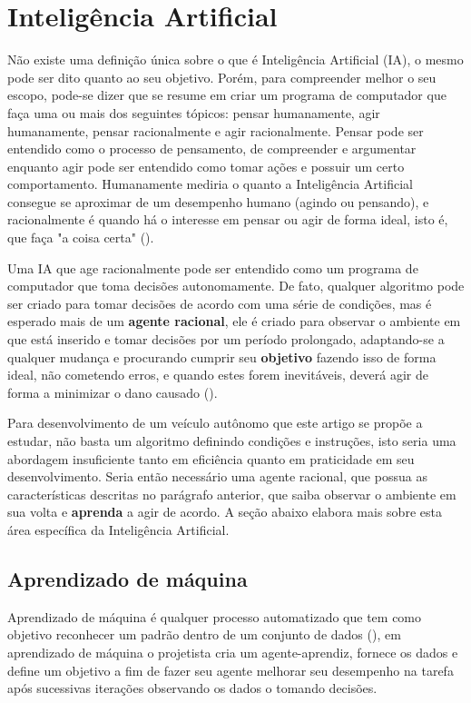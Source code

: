 \section{Inteligência Artificial}
Não existe uma definição única sobre o que é Inteligência Artificial (IA), o mesmo pode ser dito quanto ao seu objetivo. Porém, para compreender melhor o seu escopo, pode-se dizer que se resume em criar um programa de computador que faça uma ou mais dos seguintes tópicos: pensar humanamente, agir humanamente, pensar racionalmente e agir racionalmente. Pensar pode ser entendido como o processo de pensamento, de compreender e argumentar enquanto agir pode ser entendido como tomar ações e possuir um certo comportamento. Humanamente mediria o quanto a Inteligência Artificial consegue se aproximar de um desempenho humano (agindo ou pensando), e racionalmente é quando há o interesse em pensar ou agir de forma ideal, isto é, que faça "a coisa certa" ().

Uma IA que age racionalmente pode ser entendido como um programa de computador que toma decisões autonomamente. De fato, qualquer algoritmo pode ser criado para tomar decisões de acordo com uma série de condições, mas é esperado mais de um \textbf{agente racional}, ele é criado para observar o ambiente em que está inserido e tomar decisões por um período prolongado, adaptando-se a qualquer mudança e procurando cumprir seu \textbf{objetivo} fazendo isso de forma ideal, não cometendo erros, e quando estes forem inevitáveis, deverá agir de forma a minimizar o dano causado ().

Para desenvolvimento de um veículo autônomo que este artigo se propõe a estudar, não basta um algoritmo definindo condições e instruções, isto seria uma abordagem insuficiente tanto em eficiência quanto em praticidade em seu desenvolvimento. Seria então necessário uma agente racional, que possua as características descritas no parágrafo anterior, que saiba observar o ambiente em sua volta e \textbf{aprenda} a agir de acordo. A seção abaixo elabora mais sobre esta área específica da Inteligência Artificial.

\subsection{Aprendizado de máquina}
Aprendizado de máquina é qualquer processo automatizado que tem como objetivo reconhecer um padrão dentro de um conjunto de dados (), em aprendizado de máquina o projetista cria um agente-aprendiz, fornece os dados e define um objetivo a fim de fazer seu agente melhorar seu desempenho na tarefa após sucessivas iterações observando os dados o tomando decisões. 

